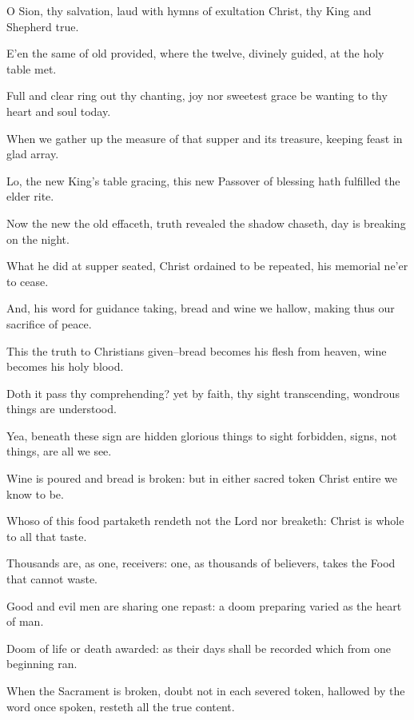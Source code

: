  O Sion, thy salvation, laud with hymns of exultation Christ, thy King and Shepherd true.\par
{}
E'en the same of old provided, where the twelve, divinely guided, at the holy table met.\par
Full and clear ring out thy chanting, joy nor sweetest grace be wanting to thy heart and soul today.\par
When we gather up the measure of that supper and its treasure, keeping feast in glad array.\par
Lo, the new King's table gracing, this new Passover of blessing hath fulfilled the elder rite.\par
Now the new the old effaceth, truth revealed the shadow chaseth, day is breaking on the night.\par
What he did at supper seated, Christ ordained to be repeated, his memorial ne'er to cease.\par
And, his word for guidance taking, bread and wine we hallow, making thus our sacrifice of peace.\par
This the truth to Christians given--bread becomes his flesh from heaven, wine becomes his holy blood.\par
Doth it pass thy comprehending? yet by faith, thy sight transcending, wondrous things are understood.\par
Yea, beneath these sign are hidden glorious things to sight forbidden, signs, not things, are all we see.\par
Wine is poured and bread is broken: but in either sacred token Christ entire we know to be.\par
Whoso of this food partaketh rendeth not the Lord nor breaketh: Christ is whole to all that taste.\par
Thousands are, as one, receivers: one, as thousands of believers, takes the Food that cannot waste.\par
Good and evil men are sharing one repast: a doom preparing varied as the heart of man.\par
Doom of life or death awarded: as their days shall be recorded which from one beginning ran.\par
When the Sacrament is broken, doubt not in each severed token, hallowed by the word once spoken, resteth all the true content.\par
